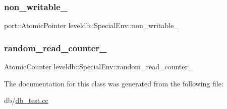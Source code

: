\mbox{\label{classleveldb_1_1_special_env_a3ecf4339c101366198febb32cfe938f0}} 
\subsubsection{\texorpdfstring{non\_writable\_}{non\_writable\_}}
{\footnotesize\ttfamily port\+::\+Atomic\+Pointer leveldb\+::\+Special\+Env\+::non\+\_\+writable\+\_\+}

\mbox{\label{classleveldb_1_1_special_env_a7cf0b2e4dcd63460e8776ae3a2c70bee}} 
\subsubsection{\texorpdfstring{random\_read\_counter\_}{random\_read\_counter\_}}
{\footnotesize\ttfamily Atomic\+Counter leveldb\+::\+Special\+Env\+::random\+\_\+read\+\_\+counter\+\_\+}



The documentation for this class was generated from the following file\+:\begin{DoxyCompactItemize}
\item 
db/\mbox{\hyperlink{db__test_8cc}{db\+\_\+test.\+cc}}\end{DoxyCompactItemize}
